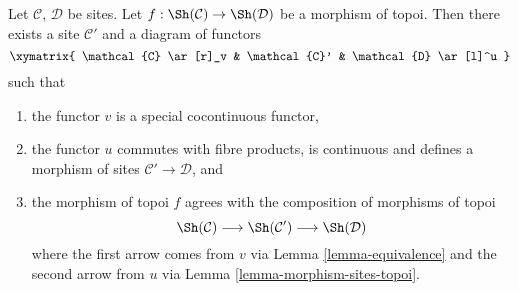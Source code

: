 \begin{lemma}
\label{lemma-morphism-topoi-comes-from-morphism-sites}
Let $\mathcal{C}$, $\mathcal{D}$ be sites.
Let $f : \Sh(\mathcal{C}) \to \Sh(\mathcal{D})$ be a
morphism of topoi.
Then there exists a site $\mathcal{C}'$ and a diagram of functors
$$
\xymatrix{
\mathcal{C} \ar[r]_v & \mathcal{C}' & \mathcal{D} \ar[l]^u
}
$$
such that
\begin{enumerate}
\item the functor $v$ is a special cocontinuous functor,
\item the functor $u$ commutes with fibre products, is
continuous and defines a morphism of sites
$\mathcal{C}' \to \mathcal{D}$, and
\item the morphism of topoi $f$ agrees with the composition
of morphisms of topoi
$$
\Sh(\mathcal{C}) \longrightarrow
\Sh(\mathcal{C}') \longrightarrow
\Sh(\mathcal{D})
$$
where the first arrow comes from $v$ via Lemma \ref{lemma-equivalence}
and the second arrow from $u$ via Lemma \ref{lemma-morphism-sites-topoi}.
\end{enumerate}
\end{lemma}

